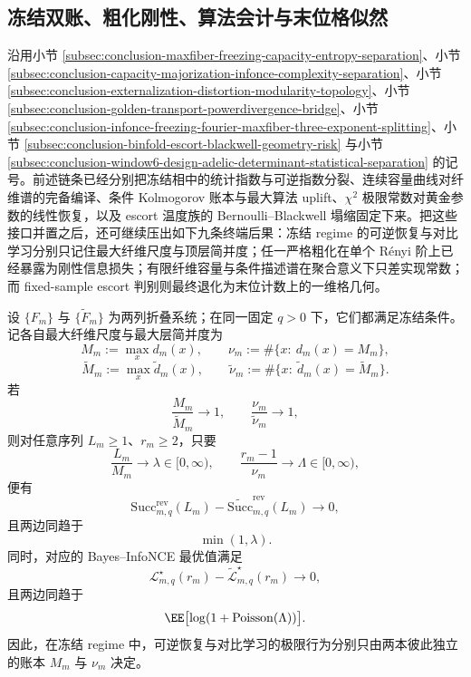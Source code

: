 \subsection{冻结双账、粗化刚性、算法会计与末位格似然}\label{subsec:conclusion-freezing-ledger-blackwell-kolmogorov-likelihood-grid}
沿用小节 \ref{subsec:conclusion-maxfiber-freezing-capacity-entropy-separation}、小节 \ref{subsec:conclusion-capacity-majorization-infonce-complexity-separation}、小节 \ref{subsec:conclusion-externalization-distortion-modularity-topology}、小节 \ref{subsec:conclusion-golden-transport-powerdivergence-bridge}、小节 \ref{subsec:conclusion-infonce-freezing-fourier-maxfiber-three-exponent-splitting}、小节 \ref{subsec:conclusion-binfold-escort-blackwell-geometry-risk} 与小节 \ref{subsec:conclusion-window6-design-adelic-determinant-statistical-separation} 的记号。前述链条已经分别把冻结相中的统计指数与可逆指数分裂、连续容量曲线对纤维谱的完备编译、条件 Kolmogorov 账本与最大算法 uplift、\(\chi^2\) 极限常数对黄金参数的线性恢复，以及 escort 温度族的 Bernoulli--Blackwell 塌缩固定下来。把这些接口并置之后，还可继续压出如下九条终端后果：冻结 regime 的可逆恢复与对比学习分别只记住最大纤维尺度与顶层简并度；任一严格粗化在单个 Rényi 阶上已经暴露为刚性信息损失；有限纤维容量与条件描述谱在聚合意义下只差实现常数；而 fixed-sample escort 判别则最终退化为末位计数上的一维格几何。

\begin{theorem}\label{thm:conclusion-freezing-dual-ledger-completeness}
设 \(\{F_m\}\) 与 \(\{\widetilde F_m\}\) 为两列折叠系统；在同一固定 \(q>0\) 下，它们都满足冻结条件。记各自最大纤维尺度与最大层简并度为
\[
M_m:=\max_x d_m(x),
\qquad
\nu_m:=\#\{x:\ d_m(x)=M_m\},
\]
\[
\widetilde M_m:=\max_x \widetilde d_m(x),
\qquad
\widetilde \nu_m:=\#\{x:\ \widetilde d_m(x)=\widetilde M_m\}.
\]
若
\[
\frac{M_m}{\widetilde M_m}\to 1,
\qquad
\frac{\nu_m}{\widetilde \nu_m}\to 1,
\]
则对任意序列 \(L_m\ge 1\)、\(r_m\ge 2\)，只要
\[
\frac{L_m}{M_m}\to \lambda\in[0,\infty),
\qquad
\frac{r_m-1}{\nu_m}\to \Lambda\in[0,\infty),
\]
便有
\[
\mathrm{Succ}^{\mathrm{rev}}_{m,q}(L_m)
-
\widetilde{\mathrm{Succ}}^{\mathrm{rev}}_{m,q}(L_m)
\longrightarrow 0,
\]
且两边同趋于
\[
\min(1,\lambda).
\]
同时，对应的 Bayes--InfoNCE 最优值满足
\[
\mathcal L^\star_{m,q}(r_m)
-
\widetilde{\mathcal L}^\star_{m,q}(r_m)
\longrightarrow 0,
\]
且两边同趋于
\[
\EE\bigl[\log(1+\mathrm{Poisson}(\Lambda))\bigr].
\]
因此，在冻结 regime 中，可逆恢复与对比学习的极限行为分别只由两本彼此独立的账本 \(M_m\) 与 \(\nu_m\) 决定。
\end{theorem}

